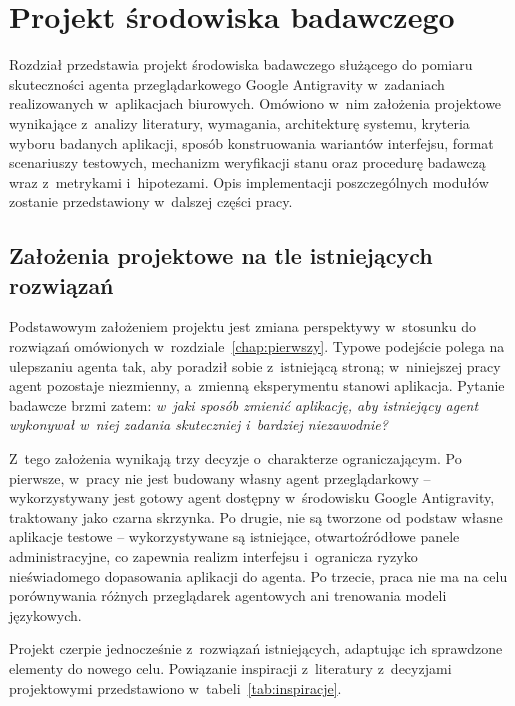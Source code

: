 \section{Projekt środowiska badawczego}
\label{chap:drugi}
Rozdział przedstawia projekt środowiska badawczego służącego do pomiaru skuteczności agenta przeglądarkowego Google Antigravity w~zadaniach realizowanych w~aplikacjach biurowych. Omówiono w~nim założenia projektowe wynikające z~analizy literatury, wymagania, architekturę systemu, kryteria wyboru badanych aplikacji, sposób konstruowania wariantów interfejsu, format scenariuszy testowych, mechanizm weryfikacji stanu oraz procedurę badawczą wraz z~metrykami i~hipotezami. Opis implementacji poszczególnych modułów zostanie przedstawiony w~dalszej części pracy.

\subsection{Założenia projektowe na tle istniejących rozwiązań}
\label{sec:zalozenia}
Podstawowym założeniem projektu jest zmiana perspektywy w~stosunku do rozwiązań omówionych w~rozdziale~\ref{chap:pierwszy}. Typowe podejście polega na ulepszaniu agenta tak, aby poradził sobie z~istniejącą stroną; w~niniejszej pracy agent pozostaje niezmienny, a~zmienną eksperymentu stanowi aplikacja. Pytanie badawcze brzmi zatem: \emph{w~jaki sposób zmienić aplikację, aby istniejący agent wykonywał w~niej zadania skuteczniej i~bardziej niezawodnie?}

Z~tego założenia wynikają trzy decyzje o~charakterze ograniczającym. Po pierwsze, w~pracy nie jest budowany własny agent przeglądarkowy -- wykorzystywany jest gotowy agent dostępny w~środowisku Google Antigravity, traktowany jako czarna skrzynka. Po drugie, nie są tworzone od podstaw własne aplikacje testowe -- wykorzystywane są istniejące, otwartoźródłowe panele administracyjne, co zapewnia realizm interfejsu i~ogranicza ryzyko nieświadomego dopasowania aplikacji do agenta. Po trzecie, praca nie ma na celu porównywania różnych przeglądarek agentowych ani trenowania modeli językowych.

Projekt czerpie jednocześnie z~rozwiązań istniejących, adaptując ich sprawdzone elementy do nowego celu. Powiązanie inspiracji z~literatury z~decyzjami projektowymi przedstawiono w~tabeli~\ref{tab:inspiracje}.

